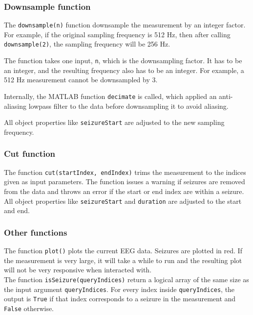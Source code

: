 \documentclass[usletter, 11pt]{extarticle}
\begin{document}
\subsubsection{Downsample function}

The \verb|downsample(n)| function downsample the measurement by an integer factor. For example, if the original sampling frequency is 512 Hz, then after calling \verb|downsample(2)|, the sampling frequency will be 256 Hz. 

The function takes one input, \verb|n|, which is the downsampling factor. It has to be an integer, and the resulting frequency also has to be an integer. For example, a 512 Hz measurement cannot be downsampled by 3.

Internally, the MATLAB function \verb|decimate| is called, which applied an anti-aliasing lowpass filter to the data before downsampling it to avoid aliasing.

All object properties like \verb|seizureStart| are adjusted to the new sampling frequency.

\subsubsection{Cut function}

The function \verb|cut(startIndex, endIndex)| trims the measurement to the indices given as input parameters. The function issues a warning if seizures are removed from the data and throws an error if the start or end index are within a seizure. All object properties like \verb|seizureStart| and \verb|duration| are adjusted to the start and end. 

\subsubsection{Other functions}

The function \verb|plot()| plots the current EEG data. Seizures are plotted in red. If the measurement is very large, it will take a while to run and the resulting plot will not be very responsive when interacted with. \\

The function \verb|isSeizure(queryIndices)| return a logical array of the same size as the input argument \verb|queryIndices|. For every index inside \verb|queryIndices|, the output is \verb|True| if that index corresponds to a seizure in the measurement and \verb|False| otherwise.

\newpage
\end{document}
